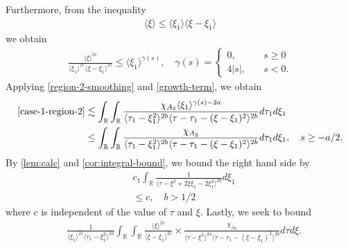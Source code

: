 \documentclass[12pt,reqno]{amsart}
\numberwithin{equation}{section}  %
\numberwithin{figure}{section}
\newcommand{\rr}{\mathbb{R}}
\theoremstyle{plain}
\theoremstyle{definition}
\theoremstyle{remark}
\begin{document}
%
%
Furthermore, from the inequality
%
%
\begin{equation*}
\begin{split}
  \langle \xi \rangle  \le \langle \xi_{1} \rangle \langle \xi - \xi_{1} \rangle 
\end{split}
\end{equation*}
%
we obtain
%
%
\begin{equation}
  \label{growth-term}
\begin{split}
  \frac{\langle \xi \rangle ^{2s}}{\langle \xi_{1} \rangle ^{2s} \langle \xi -
  \xi_{1} \rangle ^{2s}} \le \langle \xi_{1} \rangle ^{\gamma(s)},
  \quad 
  \gamma(s) = 
  \begin{cases} 0, \quad & s \ge 0
    \\
    4|s|, \quad & s < 0.
  \end{cases}
\end{split}
\end{equation}
Applying \eqref{region-2-smoothing} and \eqref{growth-term}, we obtain 
%
%
\begin{equation*}
\begin{split}
  \eqref{case-1-region-2}
  & \lesssim
  \int_{\rr} \int_{\rr}  \frac{\chi_{A_{2}} \langle \xi_{1} \rangle
  ^{\gamma(s) -2a}}{ 
  \langle \tau_{1} - \xi_{1}^{2} \rangle^{2b} \langle  \tau - \tau_{1} -
    (\xi - \xi_{1})^{2} \rangle^{2b} }
    d \tau_1 d \xi_{1}
    \\
    & \le \int_{\rr} \int_{\rr}  \frac{\chi_{A_{2}}}{ 
    \langle \tau_{1} - \xi_{1}^{2} \rangle^{2b} \langle  \tau - \tau_{1} -
    (\xi - \xi_{1})^{2} \rangle^{2b} }
    d \tau_1 d \xi_{1}, \quad s \ge -a/2.
  \end{split}
\end{equation*}
%
%
By \autoref{lem:calc} and \autoref{cor:integral-bound}, we bound the right hand
side by
%
%
\begin{equation*}
\begin{split}
  & c_{1} \int_{\rr}  \frac{1}{\langle \tau - \xi^{2} + 2 \xi \xi_{1} - 2
  \xi_{1}^{2} \rangle ^{2b}}d \xi_{1}
  \\
  & \le  c, \quad b > 1/2
\end{split}
\end{equation*}
%
%
where $c$ is independent of the value of $\tau$ and $\xi$. 
%
Lastly, we seek to bound
\begin{equation*}
\begin{split}
  &  \frac{1}{\langle \xi_{1} \rangle ^{2s}
  \langle \tau_{1} - \xi_{1}^{2}  \rangle
  ^{2a}} \int_{\rr} \int_{\rr} \frac{\langle \xi \rangle ^{2s}}{\langle
  \xi - \xi_{1}\rangle ^{2s}}  \times \frac{\chi_{A_{3}}}{\langle
  \tau - \xi^{2} \rangle ^{2a} \langle \tau - \tau_{1} - (\xi -
  \xi_{1})^{2} \rangle ^{2b}} d \tau d \xi.
\end{split}
\end{equation*}
\end{document}
